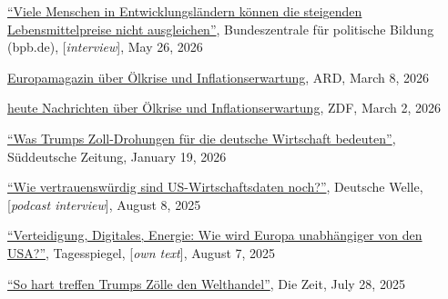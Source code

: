 \documentclass{article}
\newlength{\cvlabelwidth}\setlength{\cvlabelwidth}{0.12\textwidth}
\newlength{\cvlabelgap}\setlength{\cvlabelgap}{5mm}
\newcommand{\cvmakelabel}[1]{%
    \smash{\parbox[t]{\cvlabelwidth}{\raggedright{\fontfamily{phv}\selectfont #1}}}}
\newenvironment{cvsection}[1]{%
    \par\medskip
    \begin{list}{}{%
        \setlength{\leftmargin}{\dimexpr\cvlabelwidth+\cvlabelgap\relax}%
        \setlength{\labelwidth}{\cvlabelwidth}%
        \setlength{\labelsep}{\cvlabelgap}%
        \setlength{\rightmargin}{0pt}%
        \setlength{\itemindent}{0pt}%
        \setlength{\listparindent}{0pt}%
        \setlength{\topsep}{0pt}%
        \setlength{\partopsep}{0pt}%
        \setlength{\parsep}{0.3em}%
        \setlength{\itemsep}{0pt}%
        \let\makelabel\cvmakelabel%
    }%
    \item[#1]\ignorespaces%
}{%
    \end{list}\medskip%
}
\begin{document}
\begin{cvsection}{SELECTED MEDIA APPEARANCE}
  \href{https://www.bpb.de/kurz-knapp/hintergrund-aktuell/578241/viele-menschen-in-entwicklungslaendern-koennen-die-steigenden-lebensmittelpreise-nicht-ausgleichen/}{``Viele Menschen in Entwicklungsländern können die steigenden Lebensmittelpreise nicht ausgleichen''}, Bundeszentrale für politische Bildung (bpb.de), [\textit{interview}], May 26, 2026 \par
  \href{https://www.ardmediathek.de/video/Y3JpZDovL3dkci5kZS9CZWl0cmFnLXNvcGhvcmEtMzNjMDQwZjYtY2IxMi00OWM0LWI2YWQtYTQ2ZWE2Nzc3OWVh}{Europamagazin über Ölkrise und Inflationserwartung}, ARD, March 8, 2026 \par
  \href{https://www.zdf.de/play/magazine/heute-19-uhr-102/heute-19-uhr-vom-02-maerz-2026-100}{heute Nachrichten über Ölkrise und Inflationserwartung}, ZDF, March 2, 2026 \par
  \href{https://www.sueddeutsche.de/wirtschaft/zoll-drohungen-auswirkungen-wirtschaft-li.3371354?reduced=true}{``Was Trumps Zoll-Drohungen für die deutsche Wirtschaft bedeuten''}, Süddeutsche Zeitung, January 19, 2026 \par
  \href{https://www.dw.com/de/nach-rauswurf-wie-vertrauenswürdig-sind-us-wirtschaftsdaten-noch/audio-73561036}{``Wie vertrauenswürdig sind US-Wirtschaftsdaten noch?''}, Deutsche Welle, [\textit{podcast interview}], August 8, 2025 \par
  \href{https://www.tagesspiegel.de/internationales/verteidigung-digitales-energie-wie-wird-europa-unabhangiger-von-den-usa-14138207.html}{``Verteidigung, Digitales, Energie: Wie wird Europa unabhängiger von den USA?''}, Tagesspiegel, [\textit{own text}], August 7, 2025 \par
  \href{https://www.zeit.de/wirtschaft/2025-07/us-zoelle-handelsstreit-auswirkungen-usa}{``So hart treffen Trumps Zölle den Welthandel''}, Die Zeit, July 28, 2025 \par


\end{cvsection}
\end{document}
